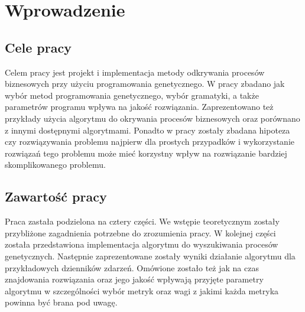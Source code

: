 \chapter{Wprowadzenie}
\label{cha:wprowadzenie}


\section{Cele pracy}
\label{sec:celePracy}

Celem pracy jest projekt i implementacja metody odkrywania procesów biznesowych przy użyciu programowania genetycznego. W pracy zbadano jak wybór metod programowania genetycznego, wybór gramatyki, a także parametrów programu wpływa na jakość rozwiązania. Zaprezentowano też przykłady użycia algorytmu do okrywania procesów biznesowych oraz porównano z innymi dostępnymi algorytmami. Ponadto w pracy zostały zbadana hipoteza czy rozwiązywania problemu najpierw dla prostych przypadków i wykorzystanie rozwiązań tego problemu może mieć korzystny wpływ na rozwiązanie bardziej skomplikowanego problemu.

\section{Zawartość pracy}
\label{sec:zawartoscPracy}

Praca zastała podzielona na cztery części. We wstępie teoretycznym zostały przybliżone zagadnienia potrzebne do zrozumienia pracy. W kolejnej części została przedstawiona implementacja algorytmu do wyszukiwania procesów genetycznych. Następnie zaprezentowane zostały wyniki działanie algorytmu dla przykładowych dzienników zdarzeń. Omówione zostało też jak na czas znajdowania rozwiązania oraz jego jakość wpływają przyjęte parametry algorytmu w szczególności wybór metryk oraz wagi z jakimi każda metryka powinna być brana pod uwagę.  


















